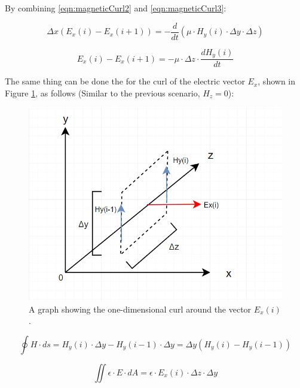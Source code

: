 By combining \ref{eqn:magneticCurl2} and \ref{eqn:magneticCurl3}:

\begin{equation}
	\label{eqn:magneticCurl4}
	\Delta x(E_x(i) - E_x(i+1)) = -\frac{d}{dt} (\mu \cdot H_y(i) \cdot \Delta y \cdot \Delta z)
\end{equation}

\begin{equation}
	\label{eqn:magneticCurl5}
	E_x(i) - E_x(i+1) = -\mu \cdot \Delta z \cdot \frac{dH_y(i)}{dt}
\end{equation}

The  same thing can be done the for the curl of the electric vector $E_x$, shown in Figure \ref{fig:fdtd1dEcurl}, as follows (Similar to the previous scenario, $H_z = 0$):

\begin{figure}
	\centering
	\includegraphics[scale=0.7]{Figures/fdtd1dEcurl}
	\decoRule
	\caption[1D Curl around $E_x$]{A graph showing the one-dimensional curl around the vector $E_x(i)$.}
	\label{fig:fdtd1dEcurl}
\end{figure}

\begin{equation}
	\label{eqn:electricCurl1}
	\oint H \cdot ds = H_y(i) \cdot \Delta y - H_y(i-1) \cdot \Delta y = \Delta y (H_y(i) - H_y(i-1))
\end{equation}

\begin{equation}
	\label{eqn:electricCurl2}
	\iint \epsilon \cdot E \cdot dA = \epsilon \cdot E_x(i) \cdot \Delta z \cdot \Delta y
\end{equation}

